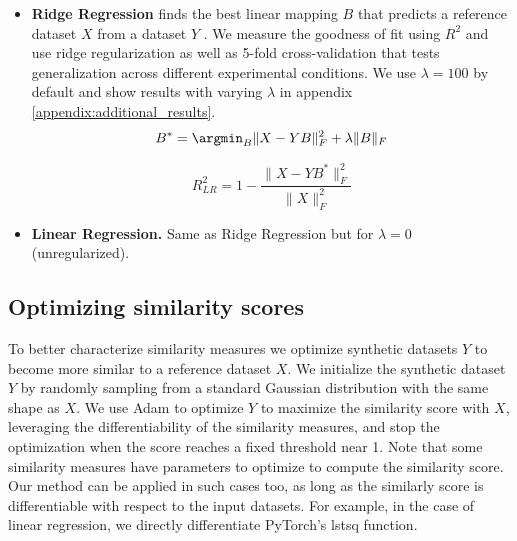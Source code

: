 \documentclass{article} %
\begin{document}
\begin{itemize}
    \item \textbf{Ridge Regression} finds the best linear mapping $B$ that predicts a reference dataset $X$ from a dataset $Y$ \citep{YaminsHong2014, SchrimpfKubilius2018}. We measure the goodness of fit using $R^2$ and use ridge regularization as well as 5-fold cross-validation that tests generalization across different experimental conditions. We use $\lambda = 100$ by default and show results with varying $\lambda$ in appendix \ref{appendix:additional_results}.%
    $$B^* = \argmin_B \| X - YB\|^2_F + \lambda \| B \|_F$$

    $$R^2_{LR} = 1 - \dfrac{\| X - YB^*\|^2_F}{\| X \|^2_F}$$

    \item \textbf{Linear Regression.} Same as Ridge Regression but for $\lambda = 0$ (unregularized).

\end{itemize}



\subsection{Optimizing similarity scores}
\label{appendix:optimizing}

To better characterize similarity measures we optimize synthetic datasets $Y$ to become more similar to a reference dataset $X$. We initialize the synthetic dataset $Y$ by randomly sampling from a standard Gaussian distribution with the same shape as $X$. We use Adam \citep{kingma2017adam} to optimize $Y$ to maximize the similarity score with $X$, leveraging the differentiability of the similarity measures, and stop the optimization when the score reaches a fixed threshold near 1. %
Note that some similarity measures have parameters to optimize to compute the similarity score. Our method can be applied in such cases too, as long as the similarly score is differentiable with respect to the input datasets. For example, in the case of linear regression, we directly differentiate PyTorch's lstsq function.
\end{document}
